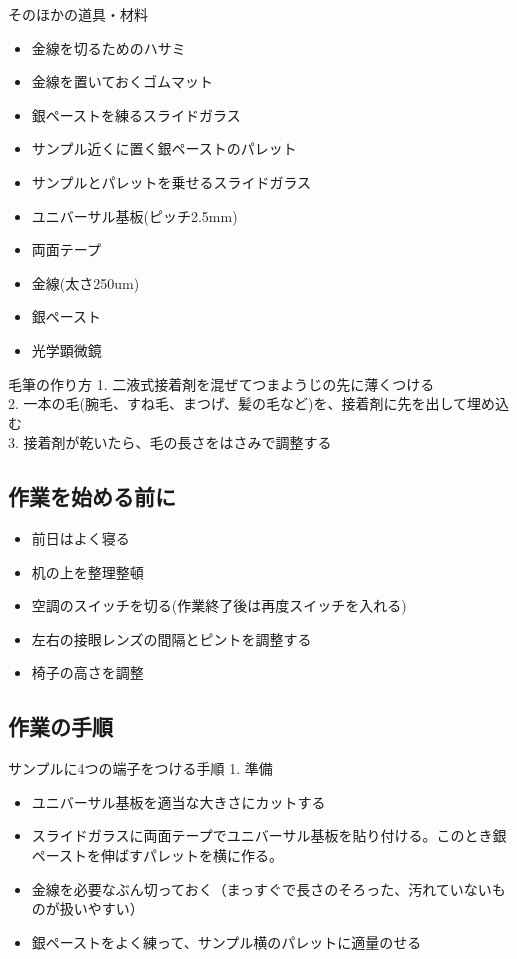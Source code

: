 \documentclass[11pt,a4paper]{jsarticle}
\begin{document}
そのほかの道具・材料
\begin{itemize}
\item 金線を切るためのハサミ
\item 金線を置いておくゴムマット
\item 銀ペーストを練るスライドガラス
\item サンプル近くに置く銀ペーストのパレット
\item サンプルとパレットを乗せるスライドガラス
\item ユニバーサル基板(ピッチ2.5mm)
\item 両面テープ
\item 金線(太さ250um)
\item 銀ペースト
\item 光学顕微鏡
\end{itemize}

毛筆の作り方
1. 二液式接着剤を混ぜてつまようじの先に薄くつける\\
2. 一本の毛(腕毛、すね毛、まつげ、髪の毛など)を、接着剤に先を出して埋め込む\\%
3. 接着剤が乾いたら、毛の長さをはさみで調整する\\


\subsection{作業を始める前に} 
\begin{itemize}
\item 前日はよく寝る
\item 机の上を整理整頓
\item 空調のスイッチを切る(作業終了後は再度スイッチを入れる)
\item 左右の接眼レンズの間隔とピントを調整する
\item 椅子の高さを調整
\end{itemize}

 
\subsection{作業の手順} 
サンプルに4つの端子をつける手順
1. 準備
\begin{itemize}
\item ユニバーサル基板を適当な大きさにカットする
\item スライドガラスに両面テープでユニバーサル基板を貼り付ける。このとき銀ペーストを伸ばすパレットを横に作る。
\item 金線を必要なぶん切っておく（まっすぐで長さのそろった、汚れていないものが扱いやすい）
\item 銀ペーストをよく練って、サンプル横のパレットに適量のせる
\end{itemize}
 
\end{document}
